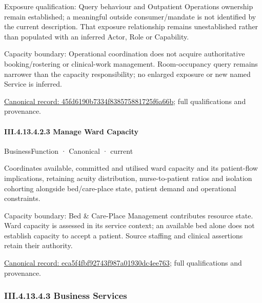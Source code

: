 Exposure qualification: Query behaviour and Outpatient Operations ownership remain established; a meaningful outside consumer/mandate is not identified by the current description. That exposure relationship remains unestablished rather than populated with an inferred Actor, Role or Capability.



Capacity boundary: Operational coordination does not acquire authoritative booking/rostering or clinical-work management. Room-occupancy query remains narrower than the capacity responsibility; no enlarged exposure or new named Service is inferred.


{\footnotesize \href{../../../../../../../continuum/business/business-function/45fd6190b7334f838575881725f6a66b.md}{Canonical record: 45fd6190b7334f838575881725f6a66b}; full qualifications and provenance.}\par
\paragraph*{III.4.13.4.2.3 Manage Ward Capacity}
\label{navigation:III.4.13.4.2.3}

\label{element:eca5f4fbf92743f987a01930dc4ee763}
{\small BusinessFunction · Canonical · current}\par

Coordinates available, committed and utilised ward capacity and its patient-flow implications, retaining acuity distribution, nurse-to-patient ratios and isolation cohorting alongside bed/care-place state, patient demand and operational constraints.



Capacity boundary: Bed \& Care-Place Management contributes resource state. Ward capacity is assessed in its service context; an available bed alone does not establish capacity to accept a patient. Source staffing and clinical assertions retain their authority.


{\footnotesize \href{../../../../../../../continuum/business/business-function/eca5f4fbf92743f987a01930dc4ee763.md}{Canonical record: eca5f4fbf92743f987a01930dc4ee763}; full qualifications and provenance.}\par
\subsubsection*{III.4.13.4.3 Business Services}
\label{navigation:III.4.13.4.3}

